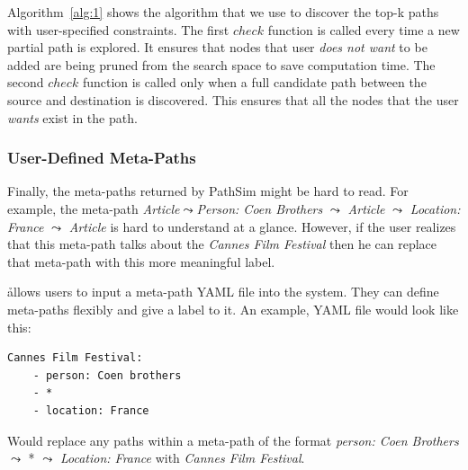 Algorithm~\ref{alg:1} shows the algorithm that we use to discover the top-k
paths with user-specified constraints. The first $check$ function
is called every time a new partial path is explored. It ensures that nodes
that user \textit{does not want} to be added are being pruned from the search
space to save computation time. The second $check$ function
is called only when a full candidate path between the source and destination
is discovered. This ensures that all the nodes that the user \textit{wants}
exist in the path.

\subsubsection{User-Defined Meta-Paths}
\label{sec:user_metapaths}

Finally, the meta-paths returned by PathSim might be hard to read.
For example, the meta-path \textit{Article}$ \leadsto $\textit{Person: Coen Brothers}
 $\leadsto$ \textit{Article} $\leadsto$ \textit{Location: France} $\leadsto$ \textit{Article}
is hard to understand at a glance. However, if the user realizes that this meta-path talks
about the \textit{Cannes Film Festival} then he can replace that meta-path with this more
meaningful label.

\h allows users to input a meta-path YAML file into the system.
They can define meta-paths flexibly and give a label to it. An example, YAML file would look
like this:
\begin{verbatim}
Cannes Film Festival:
    - person: Coen brothers
    - *
    - location: France
\end{verbatim}

Would replace any paths within a meta-path of the format \textit{person: Coen Brothers}
$\leadsto$ * $\leadsto$ \textit{Location: France} with \textit{Cannes Film Festival}.

